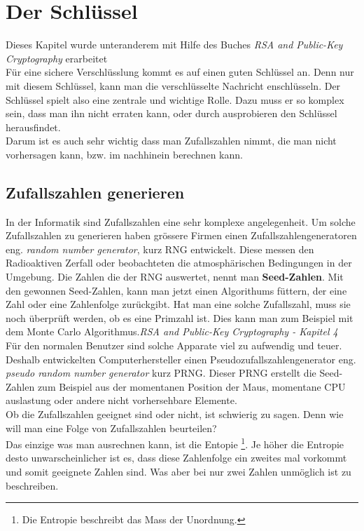\newpage
\section{Der Schlüssel}
Dieses Kapitel wurde unteranderem mit Hilfe des Buches \textit{RSA and Public-Key Cryptography} erarbeitet\\[2ex]

Für eine sichere Verschlüsslung kommt es auf einen guten Schlüssel an. Denn nur mit diesem Schlüssel, kann man die verschlüsselte Nachricht enschlüsseln. Der Schlüssel spielt also eine zentrale und wichtige Rolle. Dazu muss er so komplex sein, dass man ihn nicht erraten kann, oder durch ausprobieren den Schlüssel herausfindet.\\
Darum ist es auch sehr wichtig dass man Zufallszahlen nimmt, die man nicht vorhersagen kann, bzw. im nachhinein berechnen kann.
\subsection{Zufallszahlen generieren}
In der Informatik sind Zufallszahlen eine sehr komplexe angelegenheit. Um solche Zufallszahlen zu generieren haben grössere Firmen einen Zufallszahlengeneratoren eng. \textit{random number generator}, kurz RNG entwickelt. Diese messen den Radioaktiven Zerfall oder beobachteten die atmosphärischen Bedingungen in der Umgebung. Die Zahlen die der RNG auswertet, nennt man \textbf{Seed-Zahlen}. Mit den gewonnen Seed-Zahlen, kann man jetzt einen Algorithums füttern, der eine Zahl oder eine Zahlenfolge zurückgibt. Hat man eine solche Zufallszahl, muss sie noch überprüft werden, ob es eine Primzahl ist. Dies kann man zum Beispiel mit dem Monte Carlo Algorithmus.\textit{RSA and Public-Key Cryptography - Kapitel 4}\\
%
Für den normalen Benutzer sind solche Apparate viel zu aufwendig und teuer. Deshalb entwickelten Computerhersteller einen Pseudozufallszahlengenerator eng. \textit{pseudo random number generator} kurz PRNG. Dieser PRNG erstellt die Seed-Zahlen zum Beispiel aus der momentanen Position der Maus, momentane CPU auslastung oder andere nicht vorhersehbare Elemente.\\
Ob die Zufallszahlen geeignet sind oder nicht, ist schwierig zu sagen. Denn wie will man eine Folge von Zufallszahlen beurteilen?\\
Das einzige was man ausrechnen kann, ist die Entopie \footnote{Die Entropie beschreibt das Mass der Unordnung.}. Je höher die Entropie desto unwarscheinlicher ist es, dass diese Zahlenfolge ein zweites mal vorkommt und somit geeignete Zahlen sind. Was aber bei nur zwei Zahlen unmöglich ist zu beschreiben.

